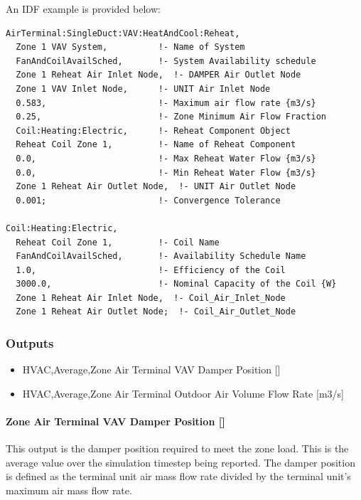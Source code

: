 An IDF example is provided below:

\begin{lstlisting}
AirTerminal:SingleDuct:VAV:HeatAndCool:Reheat,
  Zone 1 VAV System,          !- Name of System
  FanAndCoilAvailSched,       !- System Availability schedule
  Zone 1 Reheat Air Inlet Node,  !- DAMPER Air Outlet Node
  Zone 1 VAV Inlet Node,      !- UNIT Air Inlet Node
  0.583,                      !- Maximum air flow rate {m3/s}
  0.25,                       !- Zone Minimum Air Flow Fraction
  Coil:Heating:Electric,      !- Reheat Component Object
  Reheat Coil Zone 1,         !- Name of Reheat Component
  0.0,                        !- Max Reheat Water Flow {m3/s}
  0.0,                        !- Min Reheat Water Flow {m3/s}
  Zone 1 Reheat Air Outlet Node,  !- UNIT Air Outlet Node
  0.001;                      !- Convergence Tolerance

Coil:Heating:Electric,
  Reheat Coil Zone 1,         !- Coil Name
  FanAndCoilAvailSched,       !- Availability Schedule Name
  1.0,                        !- Efficiency of the Coil
  3000.0,                     !- Nominal Capacity of the Coil {W}
  Zone 1 Reheat Air Inlet Node,  !- Coil_Air_Inlet_Node
  Zone 1 Reheat Air Outlet Node;  !- Coil_Air_Outlet_Node
\end{lstlisting}

\subsubsection{Outputs}\label{outputs-4}

\begin{itemize}
\item
  HVAC,Average,Zone Air Terminal VAV Damper Position {[]}
\item
  HVAC,Average,Zone Air Terminal Outdoor Air Volume Flow Rate {[}m3/s{]}
\end{itemize}

\paragraph{Zone Air Terminal VAV Damper Position {[]}}\label{zone-air-terminal-vav-damper-position-2}

This output is the damper position required to meet the zone load. This is the average value over the simulation timestep being reported. The damper position is defined as the terminal unit air mass flow rate divided by the terminal unit's maximum air mass flow rate.

